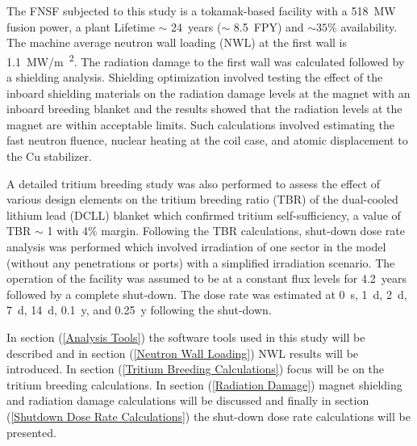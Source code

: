 \documentclass[12pt, letterpaper]{elsarticle}
\begin{document}
The FNSF subjected to this study is a tokamak-based facility with a \SI{518}{MW} fusion power, a plant Lifetime $\sim$ \SI{24}{years} ($\sim$ \SI{8.5}{FPY}) and $\sim 35\%$ availability. The machine average neutron wall loading (NWL) at the first wall is \SI{1.1}{MW/m\textsuperscript{2}}. The radiation damage to the first wall was calculated followed by a shielding analysis. Shielding optimization \cite{ref_2} involved testing the effect of the inboard shielding materials on the radiation damage levels at the magnet with an inboard breeding blanket and the results showed that the radiation levels at the magnet are within acceptable limits. Such calculations involved estimating the fast neutron fluence, nuclear heating at the coil case, and atomic displacement to the Cu stabilizer.\vspace{5mm}

A detailed tritium breeding study was also performed to assess the effect of various design elements on the tritium breeding ratio (TBR) of the dual-cooled lithium lead (DCLL) blanket which confirmed tritium self-sufficiency, a value of TBR $\sim$ 1 with 4\% margin. Following the TBR calculations, shut-down dose rate analysis was performed which involved irradiation of one sector in the model (without any penetrations or ports) with a simplified irradiation scenario. The operation of the facility was assumed to be at a constant flux levels for \SI{4.2}{years} followed by a complete shut-down. The dose rate was estimated at \SI{0}{s}, \SI{1}{d}, \SI{2}{d}, \SI{7}{d}, \SI{14}{d}, \SI{0.1}{y}, and \SI{0.25}{y} following the shut-down.\vspace{5mm}

In section (\ref{Analysis Tools}) the software tools used in this study will be described and in section (\ref{Neutron Wall Loading}) NWL results will be introduced. In section (\ref{Tritium Breeding Calculations}) focus will be on the tritium breeding calculations. In section (\ref{Radiation Damage}) magnet shielding and radiation damage calculations will be discussed and finally in section (\ref{Shutdown Dose Rate Calculations}) the shut-down dose rate calculations will be presented.
\end{document}
